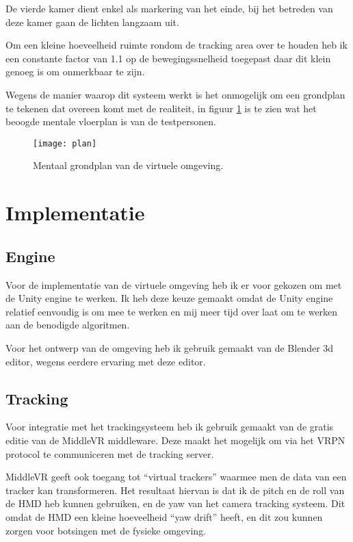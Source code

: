 De vierde kamer dient enkel als markering van het einde, bij het betreden van
deze kamer gaan de lichten langzaam uit.

Om een kleine hoeveelheid ruimte rondom de tracking area over te houden heb ik
een constante factor van 1.1 op de bewegingssnelheid toegepast daar dit klein 
genoeg is om onmerkbaar te zijn\cite{steinicke09}.

Wegens de manier waarop dit systeem werkt is het onmogelijk om een grondplan te
tekenen dat overeen komt met de realiteit, in figuur \ref{fig:plan} is te zien
wat het beoogde mentale vloerplan is van de testpersonen.

\begin{figure}[h!]
    \centering
    \texttt{[image: plan]}
    \caption{Mentaal grondplan van de virtuele omgeving.}
    \label{fig:plan}
\end{figure}


\section{Implementatie}
\subsection{Engine}
Voor de implementatie van de virtuele omgeving heb ik er voor gekozen om met de
Unity engine te werken. Ik heb deze keuze gemaakt omdat de Unity engine relatief
eenvoudig is om mee te werken en mij meer tijd over laat om te werken aan de
benodigde algoritmen.

Voor het ontwerp van de omgeving heb ik gebruik gemaakt van de Blender 3d
editor, wegens eerdere ervaring met deze editor.

\subsection{Tracking}
Voor integratie met het trackingsysteem heb ik gebruik gemaakt van de gratis
editie van de MiddleVR middleware. Deze maakt het mogelijk om via het VRPN
protocol te communiceren met de tracking server.

MiddleVR geeft ook toegang tot ``virtual trackers'' waarmee men de data van een
tracker kan transformeren. Het resultaat hiervan is dat ik de pitch en de roll
van de HMD heb kunnen gebruiken, en de yaw van het camera tracking systeem. Dit
omdat de HMD een kleine hoeveelheid ``yaw drift'' heeft, en dit zou kunnen zorgen
voor botsingen met de fysieke omgeving.

